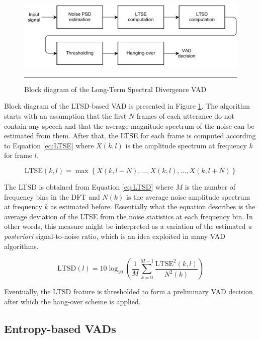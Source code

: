 \begin{figure}[htbp]
	\centering
		\includegraphics[width=0.9\columnwidth]{Figures/LTSD.png}
		\rule{37em}{0.5pt}
	\caption[Block diagram of the Long-Term Spectral Divergence VAD]{Block diagram of the Long-Term Spectral Divergence VAD \cite{LTSD}}
	\label{fig:LTSD}
\end{figure}

Block diagram of the LTSD-based VAD is presented in Figure \ref{fig:LTSD}. The algorithm starts with an assumption that the first $N$ frames of each utterance do not contain any speech and that the average magnitude spectrum of the noise can be estimated from them. After that, the LTSE for each frame is computed according to Equation \ref{eq:LTSE} where $X(k,l)$ is the amplitude spectrum at frequency $k$ for frame $l$.

\begin{equation}
\text{LTSE}(k,l) = \max \left \{ X(k,l-N),\ldots,X(k,l),\ldots,X(k,l+N) \right \}
\label{eq:LTSE}
\end{equation}

The LTSD is obtained from Equation \ref{eq:LTSD} where $M$ is the number of frequency bins in the DFT and $N(k)$ is the average noise amplitude spectrum at frequency $k$ as estimated before. Essentially what the equation describes is the average deviation of the LTSE from the noise statistics at each frequency bin. In other words, this measure might be interpreted as a variation of the estimated \emph{a posteriori} signal-to-noise ratio, which is an idea exploited in many VAD algorithms.

\begin{equation}
\text{LTSD}(l) = 10 \log_{10} \left ( \frac{1}{M} \sum_{k=0}^{M-1} \frac{\text{LTSE}^{2}(k,l)}{N^{2}(k)} \right )
\label{eq:LTSD}
\end{equation}

Eventually, the LTSD feature is thresholded to form a preliminary VAD decision after which the hang-over scheme is applied.

\subsection{Entropy-based VADs}

